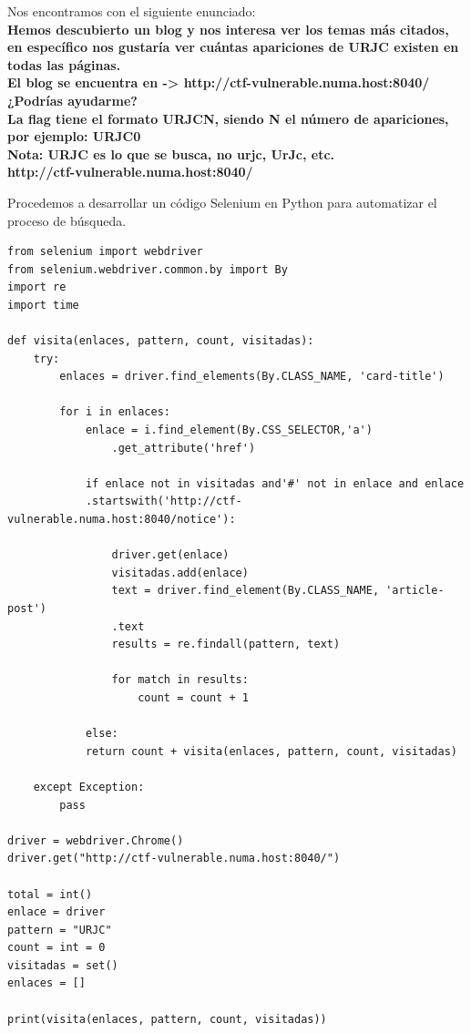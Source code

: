 \documentclass[12pt, a4paper,twoside,titlepage]{article}
\begin{document}
Nos encontramos con el siguiente enunciado:
\\
\textbf{Hemos descubierto un blog y nos interesa ver los temas más citados, en específico nos gustaría ver cuántas apariciones de URJC existen en todas las páginas.
\\
El blog se encuentra en -> http://ctf-vulnerable.numa.host:8040/
\\
¿Podrías ayudarme?
\\
La flag tiene el formato URJC{N}, siendo N el número de apariciones, por ejemplo: URJC{0}
\\
Nota: URJC es lo que se busca, no urjc, UrJc, etc.
\\
http://ctf-vulnerable.numa.host:8040/}\\

\vspace{4mm}

Procedemos a desarrollar un código Selenium en Python para automatizar el proceso de búsqueda.

\begin{verbatim}
from selenium import webdriver
from selenium.webdriver.common.by import By
import re
import time

def visita(enlaces, pattern, count, visitadas):
    try:
        enlaces = driver.find_elements(By.CLASS_NAME, 'card-title')

        for i in enlaces:
            enlace = i.find_element(By.CSS_SELECTOR,'a')
                .get_attribute('href')
        
            if enlace not in visitadas and'#' not in enlace and enlace
            .startswith('http://ctf-vulnerable.numa.host:8040/notice'):
                        
                driver.get(enlace)
                visitadas.add(enlace)
                text = driver.find_element(By.CLASS_NAME, 'article-post')
                .text
                results = re.findall(pattern, text)

                for match in results:
                    count = count + 1

            else:
            return count + visita(enlaces, pattern, count, visitadas)
            
    except Exception:
        pass

driver = webdriver.Chrome()
driver.get("http://ctf-vulnerable.numa.host:8040/") 

total = int()
enlace = driver
pattern = "URJC"
count = int = 0
visitadas = set()
enlaces = []

print(visita(enlaces, pattern, count, visitadas))
\end{verbatim}
\end{document}
